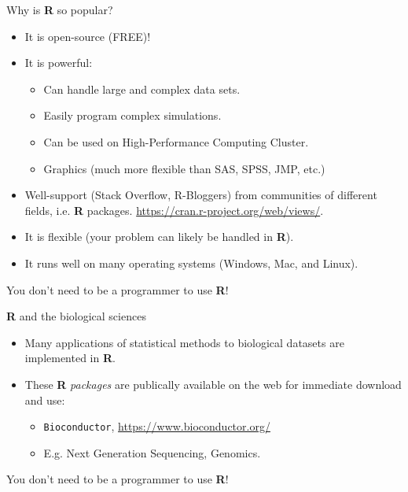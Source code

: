 \documentclass[ignorenonframetext,]{beamer}
\providecommand{\tightlist}{%
  \setlength{\itemsep}{0pt}\setlength{\parskip}{0pt}}
\begin{document}
\begin{frame}{Why is \textbf{R} so popular?}

\begin{itemize}
\item
  It is open-source (FREE)!
\item
  It is powerful:

  \begin{itemize}
  \tightlist
  \item
    Can handle large and complex data sets.
  \item
    Easily program complex simulations.
  \item
    Can be used on High-Performance Computing Cluster.
  \item
    Graphics (much more flexible than SAS, SPSS, JMP, etc.)
  \end{itemize}
\item
  Well-support (Stack Overflow, R-Bloggers) from communities of
  different fields, i.e. \textbf{R} packages.
  \url{https://cran.r-project.org/web/views/}.
\item
  It is flexible (your problem can likely be handled in \textbf{R}).
\item
  It runs well on many operating systems (Windows, Mac, and Linux).
\end{itemize}

\centering You don't need to be a programmer to use \textbf{R}!

\end{frame}

\begin{frame}[fragile]{\textbf{R} and the biological sciences}

\begin{itemize}
\item
  Many applications of statistical methods to biological datasets are
  implemented in \textbf{R}.
\item
  These \textbf{R} \emph{packages} are publically available on the web
  for immediate download and use:

  \begin{itemize}
  \tightlist
  \item
    \texttt{Bioconductor}, \url{https://www.bioconductor.org/}
  \item
    E.g. Next Generation Sequencing, Genomics.
  \end{itemize}
\end{itemize}

\centering You don't need to be a programmer to use \textbf{R}!

\end{frame}
\end{document}
